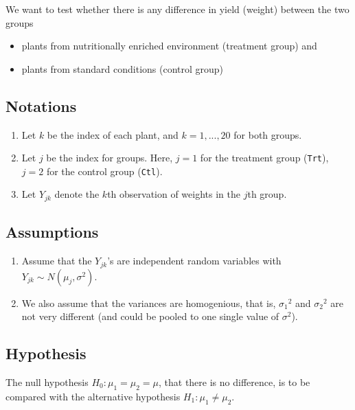\documentclass[
]{book}
\providecommand{\tightlist}{%
  \setlength{\itemsep}{0pt}\setlength{\parskip}{0pt}}
\begin{document}
We want to test whether there is any difference in yield (weight) between the two groups

\begin{itemize}
\tightlist
\item
  plants from nutritionally enriched environment (treatment group) and
\item
  plants from standard conditions (control group)
\end{itemize}

\hypertarget{notations}{%
\subsection{Notations}\label{notations}}

\begin{enumerate}
\def\labelenumi{\arabic{enumi}.}
\tightlist
\item
  Let \(k\) be the index of each plant, and \(k = 1,...,20\) for both groups.
\item
  Let \(j\) be the index for groups. Here, \(j = 1\) for the treatment group (\texttt{Trt}), \(j = 2\) for the control group (\texttt{Ctl}).
\item
  Let \(Y_{jk}\) denote the \(k\)th observation of weights in the \(j\)th group.
\end{enumerate}

\hypertarget{assumptions}{%
\subsection{Assumptions}\label{assumptions}}

\begin{enumerate}
\def\labelenumi{\arabic{enumi}.}
\tightlist
\item
  Assume that the \(Y_{jk}\)'s are independent random variables with \(Y_{jk} \sim N(\mu_j , \sigma^2)\).
\item
  We also assume that the variances are homogenious, that is, \({\sigma_1}^2\) and \({\sigma_2}^2\) are not very different (and could be pooled to one single value of \(\sigma^2\)).
\end{enumerate}

\hypertarget{hypothesis}{%
\subsection{Hypothesis}\label{hypothesis}}

The null hypothesis \(H_0 : \mu_1 = \mu_2 = \mu\), that there is no difference, is to be compared with the alternative hypothesis \(H_1 : \mu_1 \ne \mu_2\).
\end{document}
